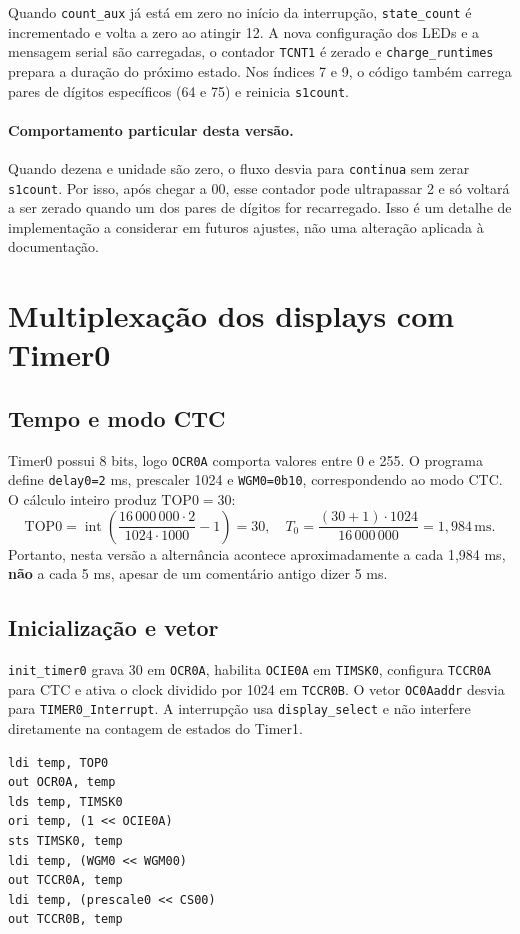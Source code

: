 \documentclass[12pt,a4paper]{article}
\newcommand{\reg}[1]{\texttt{#1}}
\newcommand{\subrot}[1]{\texttt{#1}}
\begin{document}
Quando \reg{count\_aux} já está em zero no início da interrupção, \reg{state\_count} é incrementado e volta a zero ao atingir 12. A nova configuração dos LEDs e a mensagem serial são carregadas, o contador \reg{TCNT1} é zerado e \reg{charge\_runtimes} prepara a duração do próximo estado. Nos índices 7 e 9, o código também carrega pares de dígitos específicos (64 e 75) e reinicia \reg{s1count}.

\paragraph{Comportamento particular desta versão.} Quando dezena e unidade são zero, o fluxo desvia para \reg{continua} sem zerar \reg{s1count}. Por isso, após chegar a 00, esse contador pode ultrapassar 2 e só voltará a ser zerado quando um dos pares de dígitos for recarregado. Isso é um detalhe de implementação a considerar em futuros ajustes, não uma alteração aplicada à documentação.

\section{Multiplexação dos displays com Timer0}
\subsection{Tempo e modo CTC}
Timer0 possui 8 bits, logo \reg{OCR0A} comporta valores entre 0 e 255. O programa define \reg{delay0=2} ms, prescaler 1024 e \reg{WGM0=0b10}, correspondendo ao modo CTC. O cálculo inteiro produz \(\mathrm{TOP0}=30\):
\[
\mathrm{TOP0}=\operatorname{int}\!\left(\frac{16\,000\,000\cdot2}{1024\cdot1000}-1\right)=30,
\quad T_0=\frac{(30+1)\cdot1024}{16\,000\,000}=1{,}984\,\mathrm{ms}.
\]
Portanto, nesta versão a alternância acontece aproximadamente a cada 1,984 ms, \textbf{não} a cada 5 ms, apesar de um comentário antigo dizer 5 ms.

\subsection{Inicialização e vetor}
\subrot{init\_timer0} grava 30 em \reg{OCR0A}, habilita \reg{OCIE0A} em \reg{TIMSK0}, configura \reg{TCCR0A} para CTC e ativa o clock dividido por 1024 em \reg{TCCR0B}. O vetor \reg{OC0Aaddr} desvia para \subrot{TIMER0\_Interrupt}. A interrupção usa \reg{display\_select} e não interfere diretamente na contagem de estados do Timer1.
\begin{lstlisting}
ldi temp, TOP0
out OCR0A, temp
lds temp, TIMSK0
ori temp, (1 << OCIE0A)
sts TIMSK0, temp
ldi temp, (WGM0 << WGM00)
out TCCR0A, temp
ldi temp, (prescale0 << CS00)
out TCCR0B, temp
\end{lstlisting}
\end{document}
